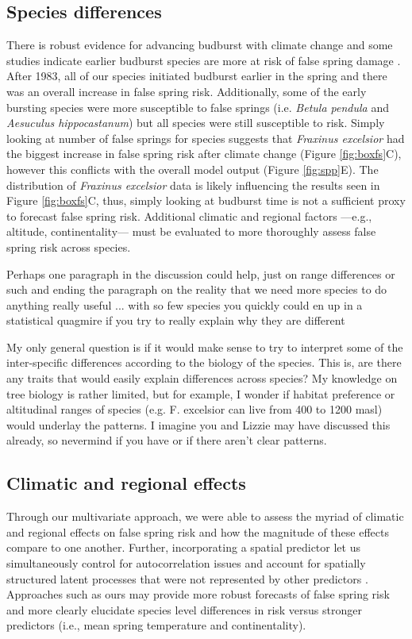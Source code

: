 \documentclass{article}\usepackage[]{graphicx}\usepackage[]{color}
\begin{document}
\subsection*{Species differences}
There is robust evidence for advancing budburst with climate change \citep{Cleland2007, IPCC2014, Wolkovich2012} and some studies indicate earlier budburst species are more at risk of false spring damage \citep{Ma2018}. After 1983, all of our species initiated budburst earlier in the spring and there was an overall increase in false spring risk. Additionally, some of the early bursting species were more susceptible to false springs (i.e. \textit{Betula pendula} and \textit{Aesuculus hippocastanum}) but all species were still susceptible to risk. Simply looking at number of false springs for species suggests that \textit{Fraxinus excelsior} had the biggest increase in false spring risk after climate change (Figure \ref{fig:boxfs}C), however this conflicts with the overall model output (Figure \ref{fig:spp}E). The distribution of \textit{Fraxinus excelsior} data is likely influencing the results seen in Figure \ref{fig:boxfs}C, thus, simply looking at budburst time is not a sufficient proxy to forecast false spring risk. Additional climatic and regional factors ---e.g., altitude, continentality--- must be evaluated to more thoroughly assess false spring risk across species.



Perhaps one paragraph in the 
discussion could help, just on range differences or such and ending the 
paragraph on the reality that we need more species to do anything really 
useful ... with so few species you quickly could en up in a statistical 
quagmire if you try to really explain why they are different

My only general question is if it would make sense to try to interpret some of the inter-specific differences according to the biology of the species. This is, are there any traits that would easily explain differences across species? My knowledge on tree biology is rather limited, but for example, I wonder if habitat preference or altitudinal ranges of species (e.g. F. excelsior can live from 400 to 1200 masl) would underlay the patterns. I imagine you and Lizzie may have discussed this already, so nevermind if you have or if there aren’t clear patterns.
  
\subsection*{Climatic and regional effects}
Through our multivariate approach, we were able to assess the myriad of climatic and regional effects on false spring risk and how the magnitude of these effects compare to one another. Further, incorporating a spatial predictor let us simultaneously control for autocorrelation issues and account for spatially structured latent processes that were not represented by other predictors \citep{griffith2006spatial,diniz2012selection,morales2012imprint,Baumen2017}. Approaches such as ours may provide more robust forecasts of false spring risk and more clearly elucidate species level differences in risk versus stronger predictors (i.e., mean spring temperature and continentality). 
\end{document}
